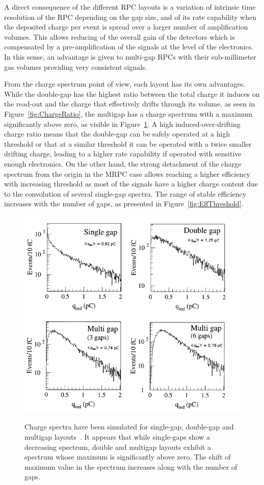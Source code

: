 	A direct consequence of the different RPC layouts is a variation of intrinsic time resolution of the RPC depending on the gap size, and of its rate capability when the deposited charge per event is spread over a larger number of amplification volumes. This allows reducing of the overall gain of the detectors which is compensated by a pre-amplification of the signals at the level of the electronics. In this sense, an advantage is given to multi-gap RPCs with their sub-millimeter gas volumes providing very consistent signals.
	
	From the charge spectrum point of view, each layout has its own advantages. While the double-gap has the highest ratio between the total charge it induces on the read-out and the charge that effectively drifts through its volume, as seen in Figure~\ref{fig:ChargeRatio}, the multigap has a charge spectrum with a maximum significantly above zero, as visible in Figure~\ref{fig:ChargeSpectra}. A high induced-over-drifting charge ratio means that the double-gap can be safely operated at a high threshold or that at a similar threshold it can be operated with a twice smaller drifting charge, leading to a higher rate capability if operated with sensitive enough electronics. On the other hand, the strong detachment of the charge spectrum from the origin in the MRPC case allows reaching a higher efficiency with increasing threshold as most of the signals have a higher charge content due to the convolution of several single-gap spectra. The range of stable efficiency increases with the number of gaps, as presented in Figure~\ref{fig:EffThreshold}.

\endgroup
	
	\begin{figure}[H]
		\centering
		\includegraphics[width = .65\linewidth]{fig/chapt3/Layout_charge_distributions.png}\\
		\caption{\label{fig:ChargeSpectra} Charge spectra have been simulated for single-gap, double-gap and multigap layouts~\cite{ABBRESCIA99}. It appears that while single-gaps show a decreasing spectrum, double and multigap layouts exhibit a spectrum whose maximum is significantly above zero. The shift of maximum value in the spectrum increases along with the number of gaps.}
	\end{figure}
	
